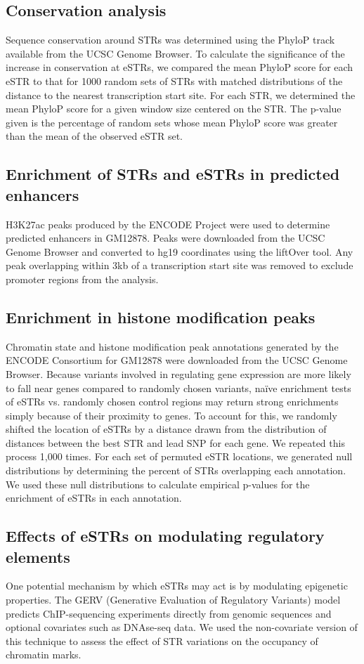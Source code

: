 \subsection{Conservation analysis}
Sequence conservation around STRs was determined using the PhyloP track available from the UCSC Genome Browser. To calculate the significance of the increase in conservation at eSTRs, we compared the mean PhyloP score for each eSTR to that for 1000 random sets of STRs with matched distributions of the distance to the nearest transcription start site. For each STR, we determined the mean PhyloP score for a given window size centered on the STR. The p-value given is the percentage of random sets whose mean PhyloP score was greater than the mean of the observed eSTR set.

\subsection{Enrichment of STRs and eSTRs in predicted enhancers}
H3K27ac peaks produced by the ENCODE Project \cite{ConsortiumDunhamKundajeEtAl2012} were used to determine predicted enhancers in GM12878. Peaks were downloaded from the UCSC Genome Browser and converted to hg19 coordinates using the liftOver tool. Any peak overlapping within 3kb of a transcription start site was removed to exclude promoter regions from the analysis. 

\subsection{Enrichment in histone modification peaks}
Chromatin state and histone modification peak annotations generated by the ENCODE Consortium for GM12878 were downloaded from the UCSC Genome Browser. Because variants involved in regulating gene expression are more likely to fall near genes compared to randomly chosen variants, naïve enrichment tests of eSTRs vs. randomly chosen control regions may return strong enrichments simply because of their proximity to genes. To account for this, we randomly shifted the location of eSTRs by a distance drawn from the distribution of distances between the best STR and lead SNP for each gene. We repeated this process 1,000 times. For each set of permuted eSTR locations, we generated null distributions by determining the percent of STRs overlapping each annotation. We used these null distributions to calculate empirical p-values for the enrichment of eSTRs in each annotation. 

\subsection{Effects of eSTRs on modulating regulatory elements}
One potential mechanism by which eSTRs may act is by modulating epigenetic properties. The GERV (Generative Evaluation of Regulatory Variants)\cite{ZengHashimotoKangEtAl2015a} model predicts ChIP-sequencing experiments directly from genomic sequences and optional covariates such as DNAse-seq data. We used the non-covariate version of this technique to assess the effect of STR variations on the occupancy of chromatin marks. 

